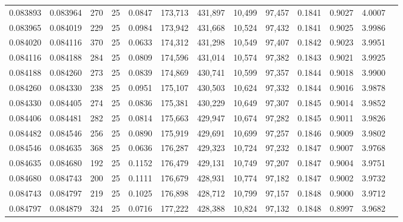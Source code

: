 \begin{tabular}{rrrrrrrrrrrrr}
0.083893 & 0.083964 &   270 &  25 &                                     0.0847 & 173,713 & 431,897 &  10,499 &  97,457 & 0.1841 & 0.9027 & 4.0007 \\
0.083965 & 0.084019 &   229 &  25 &                                     0.0984 & 173,942 & 431,668 &  10,524 &  97,432 & 0.1841 & 0.9025 & 3.9986 \\
0.084020 & 0.084116 &   370 &  25 &                                     0.0633 & 174,312 & 431,298 &  10,549 &  97,407 & 0.1842 & 0.9023 & 3.9951 \\
0.084116 & 0.084188 &   284 &  25 &                                     0.0809 & 174,596 & 431,014 &  10,574 &  97,382 & 0.1843 & 0.9021 & 3.9925 \\
0.084188 & 0.084260 &   273 &  25 &                                     0.0839 & 174,869 & 430,741 &  10,599 &  97,357 & 0.1844 & 0.9018 & 3.9900 \\
0.084260 & 0.084330 &   238 &  25 &                                     0.0951 & 175,107 & 430,503 &  10,624 &  97,332 & 0.1844 & 0.9016 & 3.9878 \\
0.084330 & 0.084405 &   274 &  25 &                                     0.0836 & 175,381 & 430,229 &  10,649 &  97,307 & 0.1845 & 0.9014 & 3.9852 \\
0.084406 & 0.084481 &   282 &  25 &                                     0.0814 & 175,663 & 429,947 &  10,674 &  97,282 & 0.1845 & 0.9011 & 3.9826 \\
0.084482 & 0.084546 &   256 &  25 &                                     0.0890 & 175,919 & 429,691 &  10,699 &  97,257 & 0.1846 & 0.9009 & 3.9802 \\
0.084546 & 0.084635 &   368 &  25 &                                     0.0636 & 176,287 & 429,323 &  10,724 &  97,232 & 0.1847 & 0.9007 & 3.9768 \\
0.084635 & 0.084680 &   192 &  25 &                                     0.1152 & 176,479 & 429,131 &  10,749 &  97,207 & 0.1847 & 0.9004 & 3.9751 \\
0.084680 & 0.084743 &   200 &  25 &                                     0.1111 & 176,679 & 428,931 &  10,774 &  97,182 & 0.1847 & 0.9002 & 3.9732 \\
0.084743 & 0.084797 &   219 &  25 &                                     0.1025 & 176,898 & 428,712 &  10,799 &  97,157 & 0.1848 & 0.9000 & 3.9712 \\
0.084797 & 0.084879 &   324 &  25 &                                     0.0716 & 177,222 & 428,388 &  10,824 &  97,132 & 0.1848 & 0.8997 & 3.9682 \\

\end{tabular}
